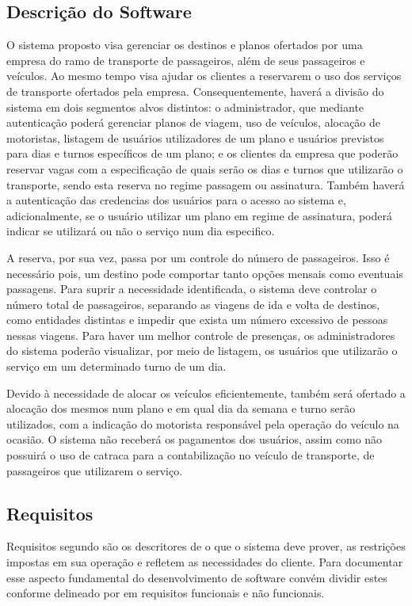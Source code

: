 \documentclass[12pt]{article}
\begin{document}
\subsection{Descrição do Software}
O sistema proposto visa gerenciar os destinos e planos ofertados por uma empresa do ramo de transporte de passageiros, além de seus passageiros e veículos. Ao mesmo tempo visa ajudar os clientes a reservarem o uso dos serviços de transporte ofertados pela empresa. Consequentemente, haverá a divisão do sistema em dois segmentos alvos distintos: o administrador, que mediante autenticação poderá gerenciar planos de viagem, uso de veículos, alocação de motoristas, listagem de usuários utilizadores de um plano e usuários previstos para dias e turnos específicos de um plano; e os clientes da empresa que poderão reservar vagas com a especificação de quais serão os dias e turnos que utilizarão o transporte, sendo esta reserva no regime passagem ou assinatura. Também haverá a autenticação das credencias dos usuários para o acesso ao sistema e, adicionalmente, se o usuário utilizar um plano em regime de assinatura, poderá indicar se utilizará ou não o serviço num dia especifico.

A reserva, por sua vez, passa por um controle do número de passageiros. Isso é necessário pois, um destino pode comportar tanto opções mensais como eventuais passagens. Para suprir a necessidade identificada, o sistema deve controlar o número total de passageiros, separando as viagens de ida e volta de destinos, como entidades distintas e impedir que exista um número excessivo de pessoas nessas viagens. Para haver um melhor controle de presenças, os administradores do sistema poderão visualizar, por meio de listagem, os usuários que utilizarão o serviço em um determinado turno de um dia. 

Devido à necessidade de alocar os veículos eficientemente, também será ofertado a alocação dos mesmos num plano e em qual dia da semana e turno serão utilizados, com a indicação do motorista responsável pela operação do veículo na ocasião.
O sistema não receberá os pagamentos dos usuários, assim como não possuirá o uso de catraca para a contabilização no veículo de transporte, de passageiros que utilizarem o serviço.

\subsection{Requisitos}
Requisitos segundo \cite{sommervile:2016} são os descritores de o que o sistema deve prover, as restrições impostas em sua operação e refletem as necessidades do cliente. Para documentar esse aspecto fundamental do desenvolvimento de software convém dividir estes conforme delineado por \cite{sommervile:2016} em requisitos funcionais e não funcionais. 
\end{document}
